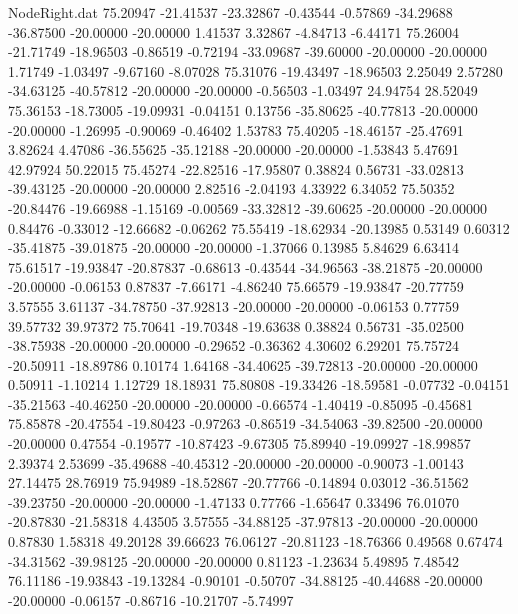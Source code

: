 \begin{filecontents}{NodeRight.dat}
  75.20947  -21.41537  -23.32867    -0.43544   -0.57869  -34.29688  -36.87500  -20.00000  -20.00000    1.41537    3.32867   -4.84713   -6.44171
  75.26004  -21.71749  -18.96503    -0.86519   -0.72194  -33.09687  -39.60000  -20.00000  -20.00000    1.71749   -1.03497   -9.67160   -8.07028
  75.31076  -19.43497  -18.96503     2.25049    2.57280  -34.63125  -40.57812  -20.00000  -20.00000   -0.56503   -1.03497   24.94754   28.52049
  75.36153  -18.73005  -19.09931    -0.04151    0.13756  -35.80625  -40.77813  -20.00000  -20.00000   -1.26995   -0.90069   -0.46402    1.53783
  75.40205  -18.46157  -25.47691     3.82624    4.47086  -36.55625  -35.12188  -20.00000  -20.00000   -1.53843    5.47691   42.97924   50.22015
  75.45274  -22.82516  -17.95807     0.38824    0.56731  -33.02813  -39.43125  -20.00000  -20.00000    2.82516   -2.04193    4.33922    6.34052
  75.50352  -20.84476  -19.66988    -1.15169   -0.00569  -33.32812  -39.60625  -20.00000  -20.00000    0.84476   -0.33012  -12.66682   -0.06262
  75.55419  -18.62934  -20.13985     0.53149    0.60312  -35.41875  -39.01875  -20.00000  -20.00000   -1.37066    0.13985    5.84629    6.63414
  75.61517  -19.93847  -20.87837    -0.68613   -0.43544  -34.96563  -38.21875  -20.00000  -20.00000   -0.06153    0.87837   -7.66171   -4.86240
  75.66579  -19.93847  -20.77759     3.57555    3.61137  -34.78750  -37.92813  -20.00000  -20.00000   -0.06153    0.77759   39.57732   39.97372
  75.70641  -19.70348  -19.63638     0.38824    0.56731  -35.02500  -38.75938  -20.00000  -20.00000   -0.29652   -0.36362    4.30602    6.29201
  75.75724  -20.50911  -18.89786     0.10174    1.64168  -34.40625  -39.72813  -20.00000  -20.00000    0.50911   -1.10214    1.12729   18.18931
  75.80808  -19.33426  -18.59581    -0.07732   -0.04151  -35.21563  -40.46250  -20.00000  -20.00000   -0.66574   -1.40419   -0.85095   -0.45681
  75.85878  -20.47554  -19.80423    -0.97263   -0.86519  -34.54063  -39.82500  -20.00000  -20.00000    0.47554   -0.19577  -10.87423   -9.67305
  75.89940  -19.09927  -18.99857     2.39374    2.53699  -35.49688  -40.45312  -20.00000  -20.00000   -0.90073   -1.00143   27.14475   28.76919
  75.94989  -18.52867  -20.77766    -0.14894    0.03012  -36.51562  -39.23750  -20.00000  -20.00000   -1.47133    0.77766   -1.65647    0.33496
  76.01070  -20.87830  -21.58318     4.43505    3.57555  -34.88125  -37.97813  -20.00000  -20.00000    0.87830    1.58318   49.20128   39.66623
  76.06127  -20.81123  -18.76366     0.49568    0.67474  -34.31562  -39.98125  -20.00000  -20.00000    0.81123   -1.23634    5.49895    7.48542
  76.11186  -19.93843  -19.13284    -0.90101   -0.50707  -34.88125  -40.44688  -20.00000  -20.00000   -0.06157   -0.86716  -10.21707   -5.74997

\end{filecontents}
